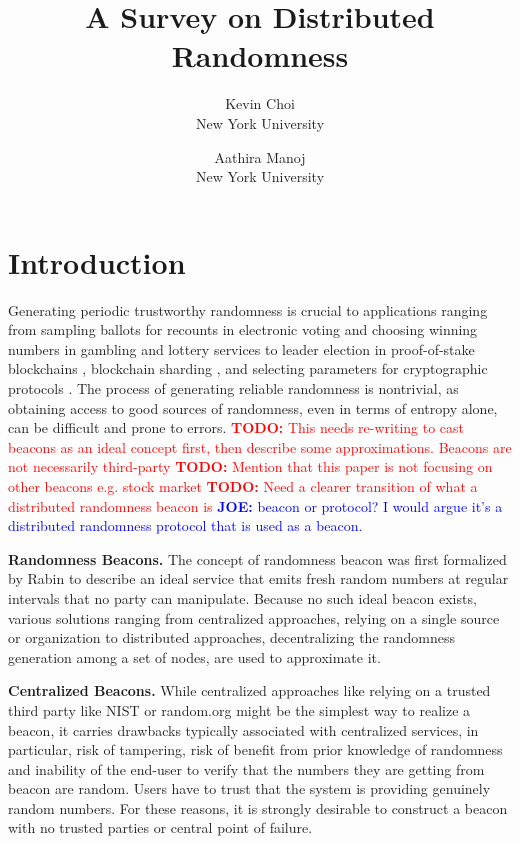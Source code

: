 \documentclass[letterpaper,twocolumn,10pt]{article}
\title{\Large \bf A Survey on Distributed Randomness}
\author{
{\rm Kevin Choi}\\
New York University
\and
{\rm Aathira Manoj}\\
New York University
}
\theoremstyle{definition}
\theoremstyle{remark}
\newcommand{\todo}[1]{\textcolor{red}{\textbf{TODO:} #1}}
\newcommand{\joenote}[1]{\textcolor{blue}{\textbf{JOE:} #1}}
\begin{document}
\maketitle
\tableofcontents

\section{Introduction}
Generating periodic trustworthy randomness is crucial to applications ranging from sampling ballots for recounts in electronic voting \cite{adida2008helios} and choosing winning numbers in gambling and lottery services \cite{bonneau2015bitcoin} to leader election in proof-of-stake blockchains \cite{gilad2017algorand, kiayias2017ouroboros}, blockchain sharding \cite{al2017chainspace, kokoris2018omniledger, luu2016secure}, and selecting parameters for cryptographic protocols \cite{baigneres2015trap, lenstra2015random}. The process of generating reliable randomness is nontrivial, as obtaining access to good sources of randomness, even in terms of entropy alone, can be difficult and prone to errors.
\todo{This needs re-writing to cast beacons as an ideal concept first, then describe some approximations. Beacons are not necessarily third-party}
\todo{Mention that this paper is not focusing on other beacons e.g. stock market}
\todo{Need a clearer transition of what a distributed randomness beacon is} \joenote{beacon or protocol? I would argue it's a distributed randomness protocol that is used as a beacon.}

\textbf{Randomness Beacons.} The concept of randomness beacon was first formalized by Rabin \cite{rabin1983Rabin} to describe an ideal service that emits fresh random numbers at regular intervals that no party can manipulate. Because no such ideal beacon exists, various solutions ranging from centralized approaches, relying on a single source or organization to distributed approaches, decentralizing the randomness generation among a set of nodes, are used to approximate it.

\textbf{Centralized Beacons.} While centralized approaches like relying on a trusted third party like NIST \cite{fischer2011public} or random.org \cite{haahr2010random} might be the simplest way to realize a beacon, it carries drawbacks typically associated with centralized services, in particular, risk of tampering, risk of benefit from prior knowledge of randomness and inability of the end-user to verify that the numbers they are getting from beacon are random. Users have to trust that the system is providing genuinely random numbers. For these reasons, it is strongly desirable to construct a beacon with no trusted parties or central point of failure.
\end{document}
